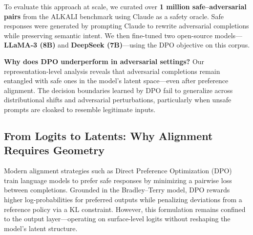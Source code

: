 To evaluate this approach at scale, we curated over \textbf{1 million safe–adversarial pairs} from the ALKALI benchmark using Claude as a safety oracle. Safe responses were generated by prompting Claude to rewrite adversarial completions while preserving semantic intent. We then fine-tuned two open-source models—\textbf{LLaMA-3 (8B)} and \textbf{DeepSeek (7B)}—using the DPO objective on this corpus.

\begin{table}[H]
\centering
\small
{}
\caption{
\textbf{Attack Success Rate (ASR)} before and after DPO fine-tuning. While marginal improvements are observed, the vulnerability gap remains substantial, suggesting that output-level preference optimization is insufficient for structural adversarial defense.
}
\label{tab:asr-dpo}
\vspace{-2mm}
\end{table}

\textbf{Why does DPO underperform in adversarial settings?} Our representation-level analysis reveals that adversarial completions remain entangled with safe ones in the model's latent space—even after preference alignment. The decision boundaries learned by DPO fail to generalize across distributional shifts and adversarial perturbations, particularly when unsafe prompts are cloaked to resemble legitimate inputs.

\subsection{From Logits to Latents: Why Alignment Requires Geometry}

Modern alignment strategies such as Direct Preference Optimization (DPO)~\cite{rafailov2023direct} train language models to prefer safe responses by minimizing a pairwise loss between completions. Grounded in the Bradley–Terry model, DPO rewards higher log-probabilities for preferred outputs while penalizing deviations from a reference policy via a KL constraint. However, this formulation remains confined to the output layer—operating on surface-level logits without reshaping the model’s latent structure.

